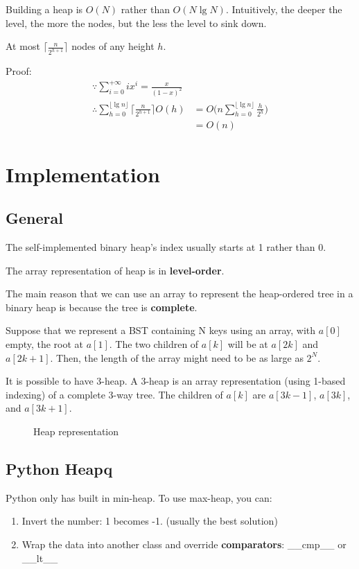 Building a heap is $O(N)$ rather than $O(N \lg N)$. Intuitively, the deeper the level, the more the nodes, but the less the level to sink down. 

At most $\big\lceil\frac{n}{2^{h+1}}\big\rceil$ nodes of any height $h$.

Proof:
\begin{align*}
\because \sum_{i=0}^{+\infty} {ix^i} =\frac{x}{(1-x)^2} \\
\therefore \sum_{h=0}^{\lfloor\lg n\rfloor}{\Big\lceil\frac{n}{2^{h+1}}\Big\rceil
O(h)} &= O\Bigg(n\sum_{h=0}^{\lfloor\lg n\rfloor}{\frac{h}{2^h}}\Bigg) \\
&= O(n)
\end{align*}

\section{Implementation}
\subsection{General}
The self-implemented binary heap's index usually starts at 1 rather than 0. 

The array representation of heap is in \textbf{level-order}.

The main reason that we can use an array to represent the heap-ordered tree in a binary heap is because the tree is \textbf{complete}.

Suppose that we represent a BST containing N keys using an array, with $a[0]$ empty, the root at $a[1]$. The two children of $a[k]$ will be at $a[2k]$ and $a[2k+1]$. Then, the length of the array might need to be as large as $2^N$.

It is possible to have 3-heap. A 3-heap is an array representation (using 1-based indexing) of a complete 3-way tree.
The children of $a[k]$ are $a[3k-1]$, $a[3k]$, and $a[3k+1]$.
\begin{figure}[hbtp]
\centering
{}
\caption{Heap representation}
\label{fig:heap} 
\end{figure}

\subsection{Python Heapq}
Python only has built in min-heap. To use max-heap, you can: 
\begin{enumerate}
\item Invert the number: 1 becomes -1.
(usually the best solution)\item Wrap the data into another class and override \textbf{comparators}: \_\_cmp\_\_ or \_\_lt\_\_
\end{enumerate}

